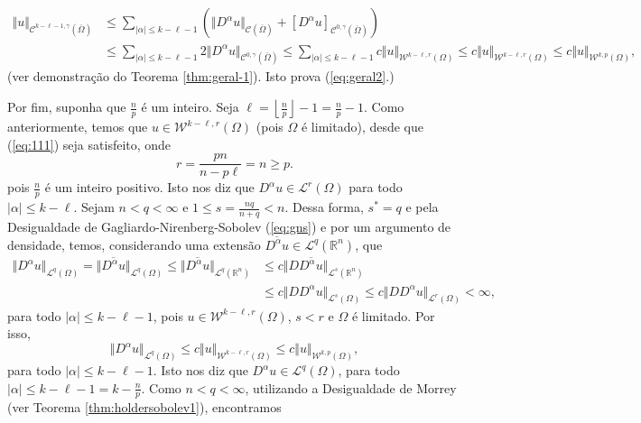 \documentclass[a4paper, 11pt]{book}
\theoremstyle{definition}
\newcommand{\bR}{\mathbb{R}}
\newcommand{\cC}{\mathcal{C}}
\newcommand{\cL}{\mathcal{L}}
\newcommand{\cW}{\mathcal{W}}
\begin{document}
\begin{prf}
\[\begin{aligned}
            \Vert u \Vert_{\cC^{k-\ell-1,\gamma}(\overline\Omega)} &\leqslant \sum_{|\alpha| \leqslant k - \ell - 1} \left( \Vert D^\alpha u \Vert_{\cC(\overline\Omega)} + [D^\alpha u]_{\cC^{0,\gamma}(\overline\Omega)} \right)\\
            &\leqslant \sum_{|\alpha| \leqslant k - \ell - 1} \!\!\!2 \Vert D^\alpha u  \Vert_{\cC^{0,\gamma}(\overline\Omega)} \leqslant \sum_{|\alpha| \leqslant k - \ell - 1} \!\!\!c \Vert u  \Vert_{\cW^{k-\ell,r}(\Omega)} \leqslant c \Vert u \Vert_{\cW^{k-\ell,r} (\Omega)} \leqslant c \Vert u \Vert_{\cW^{k,p}(\Omega)},
        \end{aligned}
    \]
    (ver demonstração do Teorema \ref{thm:geral-1}). Isto prova (\ref{eq:geral2}.)

    Por fim, suponha que $\frac{n}{p}$ é um inteiro. Seja $\ell = \left\lfloor \frac{n}{p} \right\rfloor - 1 = \frac{n}{p} - 1$.
    Como anteriormente, temos que $u \in \cW^{k-\ell,r}(\Omega)$ (pois $\Omega$ é limitado), desde que (\ref{eq:111}) seja satisfeito, onde
    \[
        r = \frac{pn}{n - p\ell} = n \geqslant p.
    \]
    pois $\frac{n}{p}$ é um inteiro positivo.
    Isto nos diz que $D^\alpha u \in \cL^r(\Omega)$ para todo $|\alpha| \leqslant k - \ell$.
    Sejam $n < q < \infty$ e $1 \leqslant s = \frac{nq}{n + q} < n$. Dessa forma, $s^* = q$ e pela Desigualdade de Gagliardo-Nirenberg-Sobolev (\ref{eq:gns})  e por um argumento de densidade, temos, considerando uma extensão $\overline{D^\alpha u} \in \cL^q(\bR^n)$, que
    \[
        \begin{aligned}
            \Vert D^\alpha u \Vert_{\cL^q(\Omega)} = \Vert \overline{D^\alpha u}  \Vert_{\cL^q(\Omega)} \leqslant \Vert \overline{D^\alpha u} \Vert_{\cL^q(\bR^n)} &\leqslant c \Vert D \overline{D^\alpha u} \Vert_{\cL^s(\bR^n)}\\ &\leqslant c \Vert D D^\alpha u \Vert_{\cL^s(\Omega)} \leqslant c\Vert D D^\alpha u \Vert_{\cL^r(\Omega)} < \infty,
        \end{aligned}
    \]
    para todo $|\alpha| \leqslant k - \ell - 1$, pois $u \in \cW^{k-\ell,r}(\Omega)$, $s < r$ e $\Omega$ é limitado. Por isso,
    \[
        \Vert D^\alpha u \Vert_{\cL^q(\Omega)} \leqslant c \Vert u \Vert_{\cW^{k-\ell,r}(\Omega)} \leqslant c \Vert u \Vert_{\cW^{k,p}(\Omega)},
    \]
    para todo $|\alpha| \leqslant k - \ell - 1$. Isto nos diz que $D^\alpha u \in \cL^q(\Omega)$, para todo $|\alpha| \leqslant k - \ell - 1 = k - \frac{n}{p}$.
    Como $n < q < \infty$, utilizando a Desigualdade de Morrey (ver Teorema \ref{thm:holdersobolev1}), encontramos

\end{prf}
\end{document}
